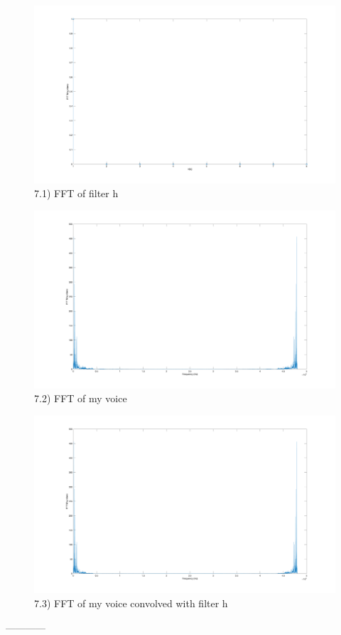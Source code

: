 \documentclass[a4paper]{article}
\begin{document}
\begin{figure}[h!]
\centering
\includegraphics[width=1.0\textwidth]{./averaging_filter.png}
\caption{7.1) FFT of filter h}
\end{figure}

\begin{figure}[h!]
\centering
\includegraphics[width=1.0\textwidth]{./myvoice.png}
\caption{7.2) FFT of my voice}
\end{figure}

\begin{figure}[h!]
\centering
\includegraphics[width=1.0\textwidth]{./convolved_voice.png}
\caption{7.3) FFT of my voice convolved with filter h}
\end{figure}


------------

 
\end{document}
